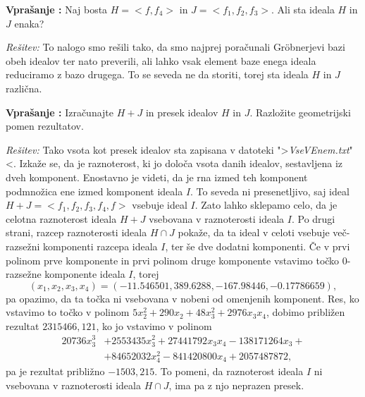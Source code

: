 \documentclass[a4paper, 10pt]{article}
\newcounter{vprcount}
\newenvironment{Vpr}{\begin{flushleft}\stepcounter{vprcount}\textbf{Vprašanje \arabic{vprcount}:}}{\hfill\end{flushleft}}
\newenvironment{Rešitev}{\begin{flushleft}\textit{Rešitev:}}{\hfill\end{flushleft}}
\begin{document}
		\begin{Vpr}
			Naj bosta $H = <f, f_4>$ in $J = <f_1, f_2, f_3>$. Ali sta ideala $H$ in $J$ enaka?
		\end{Vpr}
		\begin{Rešitev}
			To nalogo smo rešili tako, da smo najprej poračunali Gröbnerjevi bazi obeh idealov ter nato preverili, ali lahko vsak element baze enega ideala reduciramo z bazo drugega. To se seveda ne da storiti, torej sta ideala $H$ in $J$ različna.
		\end{Rešitev}
		\begin{Vpr}
			Izračunajte $H + J$ in presek idealov $H$ in $J$. Razložite geometrijski pomen rezultatov.
		\end{Vpr}
		\begin{Rešitev}
			Tako vsota kot presek idealov sta zapisana v datoteki ">\emph{VseVEnem.txt}"<. Izkaže se, da je raznoterost, ki jo določa vsota danih idealov, sestavljena iz dveh komponent. Enostavno je videti, da je rna izmed teh komponent podmnožica ene izmed komponent ideala $I$. To seveda ni presenetljivo, saj ideal $H + J = <f_1, f_2, f_3, f_4, f>$ vsebuje ideal $I$. Zato lahko sklepamo celo, da je celotna raznoterost ideala $H+J$ vsebovana v raznoterosti ideala $I$. Po drugi strani, razcep raznoterosti ideala $H\cap J$ pokaže, da ta ideal v celoti vsebuje več-razsežni komponenti razcepa ideala $I$, ter še dve dodatni komponenti. Če v prvi polinom prve komponente in prvi polinom druge komponente vstavimo točko $0$-razsežne komponente ideala $I$, torej $$(x_1, x_2, x_3, x_4)=(-11.546501, 389.6288, -167.98446, -0.17786659),$$ pa opazimo, da ta točka ni vsebovana v nobeni od omenjenih komponent. Res, ko vstavimo to točko v polinom $5x_2^2+290x_2+48x_3^2+2976x_3x_4$, dobimo približen rezultat $2315466,121$, ko jo vstavimo v polinom \begin{align*}
				20736x_3^3&+2553435x_3^2+27441792x_3x_4-138171264x_3 +\\ &+84652032x_4^2-841420800x_4+2057487872,
			\end{align*} pa je rezultat približno $-1503,215$. To pomeni, da raznoterost ideala $I$ ni vsebovana v raznoterosti ideala $H\cap J$, ima pa z njo neprazen presek.
		\end{Rešitev}
\end{document}
